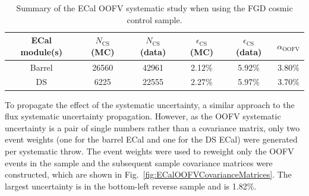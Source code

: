 \begin{table}
  \begin{tabular}{ c c c c c c }
    ECal module(s) & $N_{\textrm{CS}}$ (MC) & $N_{\textrm{CS}}$ (data) & $\epsilon_{\textrm{CS}}$ (MC) & $\epsilon_{\textrm{CS}}$ (data) & $\alpha_{\textrm{OOFV}}$ \\ \hline \hline
    Barrel & 26560 & 42961 & 2.12$\%$ & 5.92$\%$ & 3.80$\%$ \\
    DS & 6225 & 22555 & 2.27$\%$ & 5.97$\%$ & 3.70$\%$ \\
  \end{tabular}
  \caption{Summary of the ECal OOFV systematic study when using the FGD cosmic control sample.}
  \label{table:OOFVSystematicSummary}
\end{table}
\newline
\newline
To propagate the effect of the systematic uncertainty, a similar approach to the flux systematic uncertainty propagation.  However, as the OOFV systematic uncertainty is a pair of single numbers rather than a covariance matrix, only two event weights (one for the barrel ECal and one for the DS ECal) were generated per systematic throw.  The event weights were used to reweight only the OOFV events in the sample and the subsequent sample covariance matrices were constructed, which are shown in Fig.~\ref{fig:ECalOOFVCovarianceMatrices}.  The largest uncertainty is in the bottom-left reverse sample and is 1.82$\%$.
